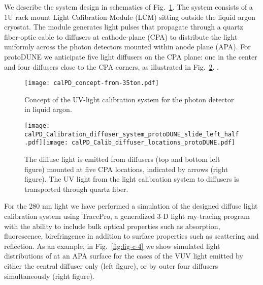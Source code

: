 We describe the system design in schematics of Fig.~\ref{fig:fig-c-1}. The system consists of a 1U rack mount Light Calibration Module (LCM) sitting outside the liquid argon cryostat. The module generates light pulses that propagate through a quartz fiber-optic cable to diffusers at cathode-plane (CPA) to distribute the light uniformly across the photon detectors mounted within anode plane (APA).  For protoDUNE we anticipate five light 
diffusers on the CPA plane: one in the center and four diffusers close to the CPA corners, as illustrated in Fig.~\ref{fig:fig-c-2}. .
%
 \begin{figure}[h]
  \centering
\texttt{[image: calPD\_concept-from-35ton.pdf]}
\caption{Concept of the UV-light calibration system for the photon detector in liquid argon.}
\label{fig:fig-c-1}
\end{figure}
%
%
 \begin{figure}[h]
  \centering
\texttt{[image: calPD\_Calibration\_diffuser\_system\_protoDUNE\_slide\_left\_half.pdf]}\texttt{[image: calPD\_Calib\_diffuser\_locations\_protoDUNE.pdf]}
\caption{The diffuse light is emitted from diffusers (top and bottom left figure) mounted at five CPA locations, indicated by arrows (right figure). 
The UV light from the light calibration system to diffusers is transported through quartz fiber.}
\label{fig:fig-c-2}
\end{figure}
%
%
For the 280 nm light we have performed a simulation of the designed diffuse light calibration system using TracePro, a generalized 3-D light ray-tracing program with the ability 
to include bulk optical properties such as absorption, fluorescence, birefringence in addition to surface properties such as scattering and reflection. 
As an example, in Fig.~\ref{fig:fig-c-4} we show simulated light distributions of at an APA surface for the cases of the VUV light emitted by either the central diffuser only (left figure), 
or by outer four diffusers simultaneously (right figure). 

